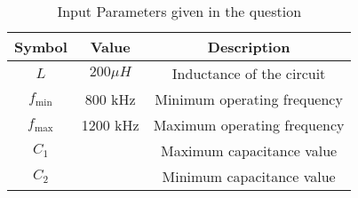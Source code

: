 \documentclass[12pt]{article}
\begin{document}
\begin{table}[h]
  \centering
  \caption{Input Parameters given in the question}
  \label{tab:parameters}
  \begin{tabular}{|c|c|c|}
    \hline
    \textbf{Symbol} & \textbf{Value} & \textbf{Description} \\
    \hline
    \(L\) & \(200 \mu H\) & Inductance of the circuit \\
    \hline
    \(f_{\text{min}}\) & 800 kHz & Minimum operating frequency \\
    \hline
    \(f_{\text{max}}\) & 1200 kHz & Maximum operating frequency \\
    \hline
    \(C_1\) &   & Maximum capacitance value \\
    \hline
    \(C_2\) &  & Minimum capacitance value \\
    \hline
  \end{tabular}
\end{table}
\end{document}
